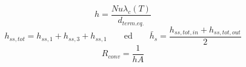 \documentclass[a4paper,10pt]{article}                                                                                       %
\begin{document}
\vspace{3mm}                                                                                                                %
\begin{equation}                                                                                                            %
  \label{eqn:h}                                                                                                             %
  h = \frac{Nu\lambda_c(T)}{d_{term.eq.}}                                                                                   %
\end{equation}                                                                                                              %
\vspace{3mm}                                                                                                                %
\begin{equation}                                                                                                            %
  \label{eqn:h_s}                                                                                                           %
  h_{ss,tot} = h_{ss,1}+h_{ss,3}+h_{ss,1}                                                                                   %
  \qquad\text{ed}\qquad                                                                                                     %
  \bar{h}_{s} = \frac{h_{ss,tot,in}+h_{ss,tot,out}}{2}                                                                      %
\end{equation}                                                                                                              %
\vspace{3mm}                                                                                                                %
\begin{equation}                                                                                                            %
  \label{eqn:conv_r}                                                                                                        %
  R_{conv} = \frac{1}{hA}                                                                                                   %
\end{equation}                                                                                                              %
\end{document}
